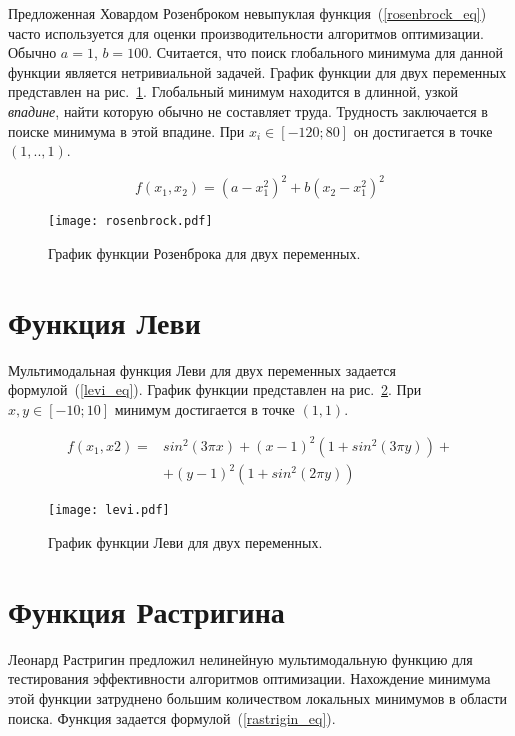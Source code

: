 Предложенная Ховардом Розенброком невыпуклая функция~(\ref{rosenbrock_eq}) часто используется для оценки производительности алгоритмов оптимизации. Обычно $a = 1$, $b = 100$. Считается, что поиск глобального минимума для данной функции является нетривиальной задачей. График функции для двух переменных представлен на рис.~\ref{rosenbrock_plot}. Глобальный минимум находится в длинной, узкой \textit{впадине}, найти которую обычно не составляет труда. Трудность заключается в поиске минимума в этой впадине. При $x_i \in [-120; 80]$ он достигается в точке $(1,..,1)$.

\begin{equation}
\label{rosenbrock_eq}
f(x_1, x_2) = (a - x_1^2)^2 + b(x_2 - x_1^2)^2
\end{equation}


\begin{figure}
    \centering
    \texttt{[image: rosenbrock.pdf]}
    \caption{График функции Розенброка для двух переменных.}
    \label{rosenbrock_plot}
\end{figure}

\section{Функция Леви}

Мультимодальная функция Леви для двух переменных задается формулой~(\ref{levi_eq}). График функции представлен на рис.~\ref{levi_plot}. При $x, y \in [-10; 10]$ минимум достигается в точке $(1, 1)$.

\begin{equation}
\label{levi_eq}
\begin{split}
f(x_1, x2) = &sin^2(3\pi x) + (x - 1)^2(1 + sin^2(3\pi y)) + \\
& + (y - 1)^2(1 + sin^2(2\pi y))
\end{split}
\end{equation}

\begin{figure}
    \centering
    \texttt{[image: levi.pdf]}
    \caption{График функции Леви для двух переменных.}
    \label{levi_plot}
\end{figure}

\section{Функция Растригина}

Леонард Растригин предложил нелинейную мультимодальную функцию для тестирования эффективности алгоритмов оптимизации. Нахождение минимума этой функции затруднено большим количеством локальных минимумов в области поиска. Функция задается формулой~(\ref{rastrigin_eq}).

